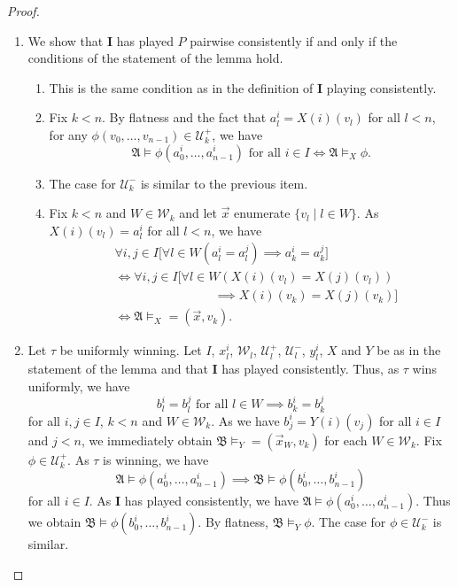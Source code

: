 \documentclass[10pt,a4paper]{amsart}
\newcommand{\playerone}{\mathrm{\mathbf{I}}}
\newcommand{\W}{\mathcal W}
\newcommand{\U}{\mathcal U}
\newcommand{\A}{\mathfrak{A}}
\newcommand{\B}{\mathfrak{B}}
\newcommand{\dep}{\mathop{=}}
\begin{document}
\begin{proof}\quad
    \begin{enumerate}
        \item We show that $\playerone$ has played $P$ pairwise consistently if and only if the conditions of the statement of the lemma hold.
        \begin{enumerate}
            \item This is the same condition as in the definition of $\playerone$ playing consistently.
            \item Fix $k<n$. By flatness and the fact that $a^i_l = X(i)(v_l)$ for all $l<n$, for any $\phi(v_0,\dots,v_{n-1})\in\U^+_k$, we have
            \[
                \text{$\A\models\phi(a_0^i,\dots,a_{n-1}^i)$ for all $i\in I$} \iff \A\models_X\phi.
            \]
            \item The case for $\U^-_k$ is similar to the previous item.
            \item Fix $k<n$ and $W\in\W_k$ and let $\vec x$ enumerate $\{v_l \mid l\in W\}$. As $X(i)(v_l) = a^i_l$ for all $l<n$, we have
            \begin{align*}
                &\forall i,j\in I \bigg[ \forall l\in W (a^i_l = a^j_l) \implies a^i_k = a^j_k \bigg] \\
                &\iff \forall i,j\in I \bigg[ \forall l\in W (X(i)(v_l) = X(j)(v_l)) \\
                &\hspace{8em}\implies X(i)(v_k) = X(j)(v_k) \bigg] \\
                &\iff \A\models_X\dep(\vec x, v_k).
            \end{align*}
        \end{enumerate}

        \item Let $\tau$ be uniformly winning. Let $I$, $x^i_l$, $\W_l$, $\U^+_l$, $\U^-_l$, $y^i_l$, $X$ and $Y$ be as in the statement of the lemma and that $\playerone$ has played consistently. Thus, as $\tau$ wins uniformly, we have
        \[
            \text{$b^i_l = b^j_l$ for all $l\in W$} \implies b^i_k = b^j_k
        \]
        for all $i,j\in I$, $k<n$ and $W\in\W_k$. As we have $b^i_j = Y(i)(v_j)$ for all $i\in I$ and $j<n$, we immediately obtain $\B\models_Y\dep(\vec x_W,v_k)$ for each $W\in\W_k$. Fix $\phi\in\U^+_k$. As $\tau$ is winning, we have
        \[
            \A\models\phi(a^i_0,\dots,a^i_{n-1}) \implies \B\models\phi(b^i_0,\dots,b^i_{n-1})
        \]
        for all $i\in I$. As $\playerone$ has played consistently, we have $\A\models\phi(a^i_0,\dots,a^i_{n-1})$. Thus we obtain $\B\models\phi(b^i_0,\dots,b^i_{n-1})$. By flatness, $\B\models_Y\phi$. The case for $\phi\in\U^-_k$ is similar.
    

\end{enumerate}
\end{proof}
\end{document}
